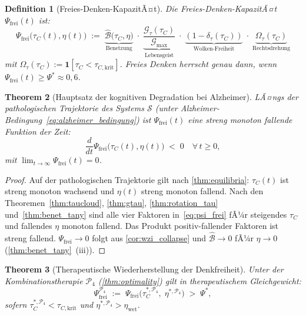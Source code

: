﻿\documentclass[12pt,a4paper]{article}
\newtheorem{theorem}{Theorem}[section]
\newtheorem{definition}[theorem]{Definition}
\theoremstyle{definition}
\begin{document}
	\begin{definition}[Freies-Denken-KapazitÃ¤t]
		\label{def:psi_frei}
		Die \emph{Freies-Denken-KapazitÃ¤t} $\Psi_{\mathrm{frei}}(t)$ ist:
		\begin{equation}
			\boxed{
			\Psi_{\mathrm{frei}}\bigl(\tau_C(t), \eta(t)\bigr)
			\;:=\;
			\underbrace{\hat{\mathcal{B}}\bigl(\tau_C, \eta\bigr)}_{\text{Benetzung}}
			\;\cdot\;
			\underbrace{\dfrac{\mathcal{G}_\tau(\tau_C)}{\mathcal{G}_{\max}}}_{\text{Lebensgeist}}
			\;\cdot\;
			\underbrace{(1 - \delta_\tau(\tau_C))}_{\text{Wolken-Freiheit}}
			\;\cdot\;
			\underbrace{\Omega_\tau(\tau_C)}_{\text{Rechtsdrehung}}
			}
			\label{eq:psi_frei}
		\end{equation}
		mit $\Omega_\tau(\tau_C) := \mathbf{1}[\tau_C < \tau_{C,\mathrm{krit}}]$.
		Freies Denken herrscht genau dann, wenn $\Psi_{\mathrm{frei}}(t) \geq \Psi^* \approx 0{,}6$.
	\end{definition}

	\begin{theorem}[Hauptsatz der kognitiven Degradation bei Alzheimer]
		\label{thm:hauptsatz}
		LÃ¤ngs der pathologischen Trajektorie des Systems $\mathcal{S}$ (unter
		Alzheimer-Bedingung~\eqref{eq:alzheimer_bedingung}) ist $\Psi_{\mathrm{frei}}(t)$
		eine streng monoton fallende Funktion der Zeit:
		\[
			\frac{d}{dt}\Psi_{\mathrm{frei}}\bigl(\tau_C(t), \eta(t)\bigr) \;<\; 0
			\quad \forall\, t \geq 0,
		\]
		mit $\lim_{t \to \infty} \Psi_{\mathrm{frei}}(t) = 0$.
	\end{theorem}

	\begin{proof}
		Auf der pathologischen Trajektorie gilt nach \cref{thm:equilibria}:
		$\tau_C(t)$ ist streng monoton wachsend und $\eta(t)$ streng monoton fallend.
		Nach den Theoremen~\ref{thm:taucloud}, \ref{thm:gtau}, \ref{thm:rotation_tau}
		und~\ref{thm:benet_tany} sind alle vier Faktoren in~\eqref{eq:psi_frei}
		fÃ¼r steigendes $\tau_C$ und fallendes $\eta$ monoton fallend.
		Das Produkt positiv-fallender Faktoren ist streng fallend.
		$\Psi_{\mathrm{frei}} \to 0$ folgt aus \cref{cor:wzi_collapse} und
		$\hat{\mathcal{B}} \to 0$ fÃ¼r $\eta \to 0$ (\cref{thm:benet_tany}~(iii)).
	\end{proof}

	\begin{theorem}[Therapeutische Wiederherstellung der Denkfreiheit]
		\label{thm:psi_therapie}
		Unter der Kombinationstherapie $\mathcal{P}_4$ (\cref{thm:optimality}) gilt in
		therapeutischem Gleichgewicht:
		\[
			\Psi_{\mathrm{frei}}^{\mathcal{P}_4}
			\;:=\; \Psi_{\mathrm{frei}}\!\bigl(\tau_C^{*,\mathcal{P}_4},\;\eta^{*,\mathcal{P}_4}\bigr)
			\;>\; \Psi^*,
		\]
		sofern
		$\tau_C^{*,\mathcal{P}_4} < \tau_{C,\mathrm{krit}}$
		und
		$\eta^{*,\mathcal{P}_4} > \eta_{\mathrm{wet}}$.
	\end{theorem}
\end{document}
